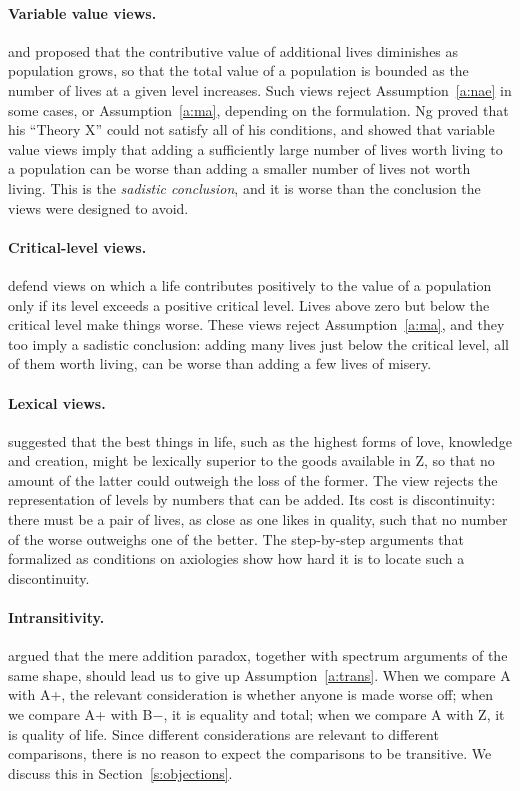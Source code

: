 \documentclass{situationist-preprint}
\begin{document}
\paragraph{Variable value views.} \citet{Hurka1983} and \citet{Ng1989} proposed that the contributive value of additional lives diminishes as population grows, so that the total value of a population is bounded as the number of lives at a given level increases. Such views reject Assumption~\ref{a:nae} in some cases, or Assumption~\ref{a:ma}, depending on the formulation. Ng proved that his ``Theory X'' could not satisfy all of his conditions, and \citet{Arrhenius2000} showed that variable value views imply that adding a sufficiently large number of lives worth living to a population can be worse than adding a smaller number of lives not worth living. This is the \emph{sadistic conclusion}, and it is worse than the conclusion the views were designed to avoid.

\paragraph{Critical-level views.} \citet{Blackorby2005} defend views on which a life contributes positively to the value of a population only if its level exceeds a positive critical level. Lives above zero but below the critical level make things worse. These views reject Assumption~\ref{a:ma}, and they too imply a sadistic conclusion: adding many lives just below the critical level, all of them worth living, can be worse than adding a few lives of misery.

\paragraph{Lexical views.} \citet{Parfit1986} suggested that the best things in life, such as the highest forms of love, knowledge and creation, might be lexically superior to the goods available in Z, so that no amount of the latter could outweigh the loss of the former. The view rejects the representation of levels by numbers that can be added. Its cost is discontinuity: there must be a pair of lives, as close as one likes in quality, such that no number of the worse outweighs one of the better. The step-by-step arguments that \citet{Arrhenius2000} formalized as conditions on axiologies show how hard it is to locate such a discontinuity.

\paragraph{Intransitivity.} \citet{Temkin2012} argued that the mere addition paradox, together with spectrum arguments of the same shape, should lead us to give up Assumption~\ref{a:trans}. When we compare A with A+, the relevant consideration is whether anyone is made worse off; when we compare A+ with B$-$, it is equality and total; when we compare A with Z, it is quality of life. Since different considerations are relevant to different comparisons, there is no reason to expect the comparisons to be transitive. We discuss this in Section~\ref{s:objections}.
\end{document}
